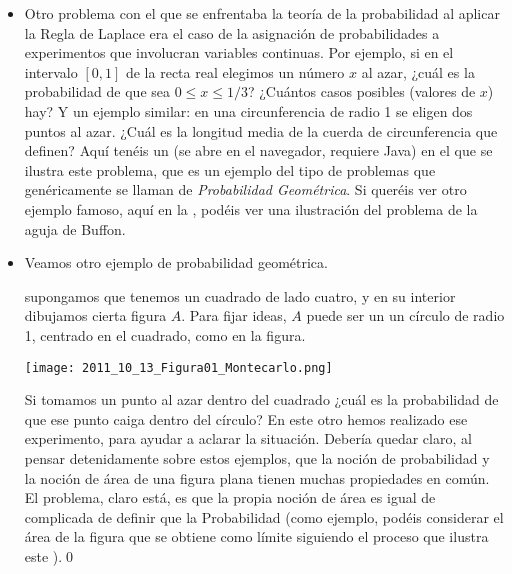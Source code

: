 \begin{itemize}
    \item Otro problema con el que se enfrentaba la teoría de la probabilidad al aplicar la Regla de Laplace era el caso de la asignación de probabilidades a experimentos que involucran variables continuas. Por ejemplo, si en el intervalo $[0,1]$ de la recta real elegimos un número $x$ al azar, ¿cuál es la probabilidad de que sea $0\leq x\leq 1/3$? ¿Cuántos casos posibles (valores de $x$) hay? Y un ejemplo similar: en una circunferencia de radio 1 se eligen dos puntos al azar. ¿Cuál es la longitud media de la cuerda de circunferencia que definen? Aquí tenéis un  (se abre en el navegador, requiere Java) en el que se ilustra este problema, que es un ejemplo del tipo de problemas que genéricamente se llaman de {\em Probabilidad Geométrica}. Si queréis ver otro ejemplo famoso, aquí en la , podéis ver una ilustración del
problema de la aguja de Buffon.\\

    \item Veamos otro ejemplo de probabilidad geométrica.
     \begin{Ejemplo}\label{Sesion08:ejem:ProbabilidadGeometricaMontecarlo}
     supongamos que tenemos un cuadrado de lado cuatro, y en su interior dibujamos cierta figura $A$. Para fijar ideas, $A$ puede ser un un círculo de radio 1, centrado en el cuadrado, como en la figura.
        \begin{center}
         \texttt{[image: 2011\_10\_13\_Figura01\_Montecarlo.png]}
         \end{center}

    Si tomamos un punto al azar dentro del cuadrado ¿cuál es la probabilidad de que ese punto caiga dentro del círculo? En este otro  hemos realizado ese experimento, para ayudar a aclarar la situación. Debería quedar claro, al pensar detenidamente sobre estos ejemplos, que la noción de probabilidad y la noción de área de una figura plana tienen muchas propiedades en común. El problema, claro está, es que la propia noción de área es igual de complicada de definir que la Probabilidad (como ejemplo, podéis considerar el área de la figura que se obtiene como límite siguiendo el proceso que ilustra este ).\qed
    \end{Ejemplo}


\end{itemize}
